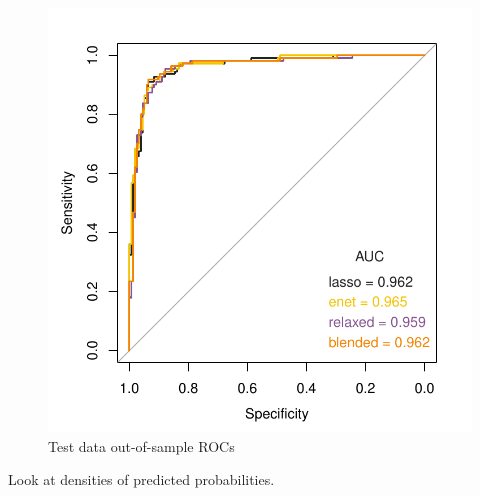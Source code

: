 \documentclass[
]{book}
\begin{document}
\begin{figure}
\centering
\includegraphics{Static/figures/hcc5hmC-glmnetFit-testROC2-1.pdf}
\caption{\label{fig:hcc5hmC-glmnetFit-testROC2}Test data out-of-sample ROCs}
\end{figure}

Look at densities of predicted probabilities.
\end{document}

